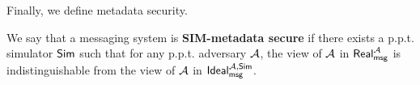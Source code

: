 Finally, we define metadata security.

\begin{definition}
\label{defn:messaging-security}
We say that a messaging system is \textbf{SIM-metadata secure} if there exists a p.p.t. simulator $\mathsf{Sim}$ such that for any p.p.t. adversary $\mathcal{A}$, the view of $\mathcal{A}$ in $\mathsf{Real}_{\mathsf{msg}}^{\mathcal{A}}$ is indistinguishable from the view of $\mathcal{A}$ in $\mathsf{Ideal}^{\mathcal{A}, \mathsf{\mathsf{Sim}}}_{\mathsf{msg}}$.
\end{definition}


